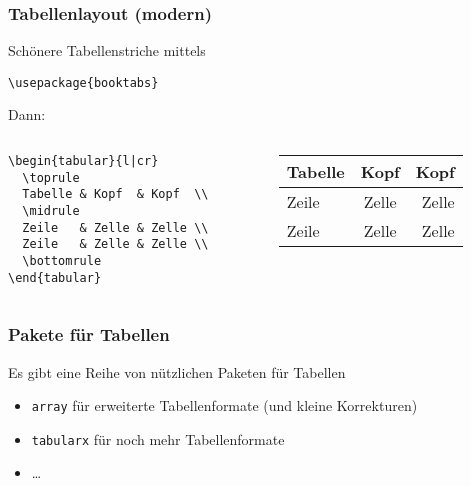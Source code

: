 \begin{frame}[fragile]
  \frametitle{Tabellenlayout (modern)}

  \onslide<+->

  Schönere Tabellenstriche mittels

\begin{lstlisting}
\usepackage{booktabs}
\end{lstlisting}

  \onslide<+->

  \bigskip

  Dann:

  \begin{columns}
    \begin{column}{0.55\linewidth}
\begin{lstlisting}
\begin{tabular}{l|cr}
  \toprule
  Tabelle & Kopf  & Kopf  \\
  \midrule
  Zeile   & Zelle & Zelle \\
  Zeile   & Zelle & Zelle \\
  \bottomrule
\end{tabular}
\end{lstlisting}
    \end{column}
    \begin{column}{0.45\linewidth}
      \centering
      \begin{tabular}{l|cr}
        \toprule
        Tabelle & Kopf & Kopf \\
        \midrule
        Zeile & Zelle & Zelle \\
        Zeile & Zelle & Zelle \\
        \bottomrule
      \end{tabular}
    \end{column}
  \end{columns}

\end{frame}

\begin{frame}
  \frametitle{Pakete für Tabellen}

  \onslide<+->

  Es gibt eine Reihe von nützlichen Paketen für Tabellen

  \begin{itemize}
  \item<+-> \lstinline!array! für erweiterte Tabellenformate (und kleine Korrekturen)
  \item<+-> \lstinline!tabularx! für noch mehr Tabellenformate
  \item<+-> \dots
  \end{itemize}

\end{frame}

